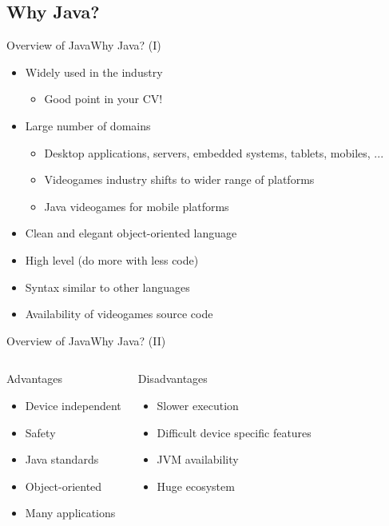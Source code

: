 \documentclass{beamer}
\begin{document}
\subsection[Why Java?]{Why Java?}
\begin{frame}{Overview of Java}{Why Java? (I)}
	\begin{itemize}
	\item Widely used in the industry
		\begin{itemize}
		\item Good point in your CV!
		\end{itemize}
	\item Large number of domains
		\begin{itemize}
		\item Desktop applications, servers, embedded systems, tablets, mobiles, ...
		\item Videogames industry shifts to wider range of platforms
		\item Java videogames for mobile platforms
		\end{itemize}
	\item Clean and elegant object-oriented language
	\item High level (do more with less code)
	\item Syntax similar to other languages
	\item Availability of videogames source code
  	\end{itemize}
\end{frame}

\begin{frame}{Overview of Java}{Why Java? (II)}
    \begin{columns}
	   \begin{block}{Advantages}
  		\begin{itemize}
		\item Device independent
		\item Safety
		\item Java standards
		\item Object-oriented
		\item Many applications
  		\end{itemize}
		\end{block}
		\begin{block}{Disadvantages}
		\begin{itemize}
		\item Slower execution
		\item Difficult device specific features
		\item JVM availability
		\item Huge ecosystem
  		\end{itemize}
		\end{block}
	\end{columns}
\end{frame}
\end{document}
